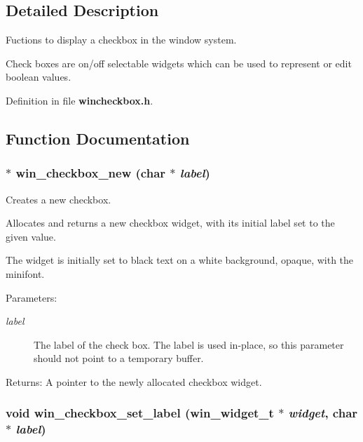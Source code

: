 \subsection{Detailed Description}
Fuctions to display a checkbox in the window system. 

Check boxes are on/off selectable widgets which can be used to represent or edit boolean values. 

Definition in file {\bf wincheckbox.h}.

\subsection{Function Documentation}
\subsubsection{$\ast$ win\_\-checkbox\_\-new (char $\ast$ {\em label})}\label{wincheckbox_8h_a0}


Creates a new checkbox. 

Allocates and returns a new checkbox widget, with its initial label set to the given value.

The widget is initially set to black text on a white background, opaque, with the minifont.

\begin{Desc}
\item[Parameters:]
\begin{description}
\item[{\em label}]The label of the check box. The label is used in-place, so this parameter should not point to a temporary buffer.\end{description}
\end{Desc}
\begin{Desc}
\item[Returns:]A pointer to the newly allocated checkbox widget. \end{Desc}
\subsubsection{\setlength{\rightskip}{0pt plus 5cm}void win\_\-checkbox\_\-set\_\-label ({\bf win\_\-widget\_\-t} $\ast$ {\em widget}, char $\ast$ {\em label})}\label{wincheckbox_8h_a1}


